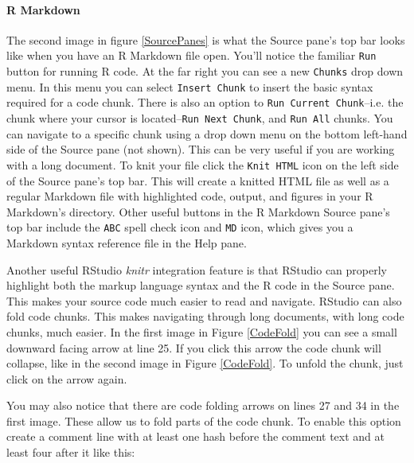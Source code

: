 \paragraph{R Markdown} The second image in figure \ref{SourcePanes} is what the Source pane's top bar looks like when you have an R Markdown file open. You'll notice the familiar \texttt{Run} button for running R code. At the far right you can see a new \texttt{Chunks} drop down menu. In this menu you can select \texttt{Insert Chunk} to insert the basic syntax required for a code chunk. There is also an option to \texttt{Run Current Chunk}--i.e. the chunk where your cursor is located--\texttt{Run Next Chunk}, and \texttt{Run All} chunks. You can navigate to a specific chunk using a drop down menu on the bottom left-hand side of the Source pane (not shown). This can be very useful if you are working with a long document. To knit your file click the \texttt{Knit HTML} icon on the left side of the Source pane's top bar. This will create a knitted HTML file as well as a regular Markdown file with highlighted code, output, and figures in your R Markdown's directory. Other useful buttons in the R Markdown Source pane's top bar include the \texttt{ABC} spell check icon and \texttt{MD} icon, which gives you a Markdown syntax reference file in the Help pane.

Another useful RStudio {\emph{knitr}} integration feature is that RStudio can properly highlight both the markup language syntax and the R code in the Source pane. This makes your source code much easier to read and navigate. RStudio can also fold code chunks. This makes navigating through long documents, with long code chunks, much easier. In the first image in Figure \ref{CodeFold} you can see a small downward facing arrow at line 25. If you click this arrow the code chunk will collapse, like in the second image in Figure \ref{CodeFold}. To unfold the chunk, just click on the arrow again.

You may also notice that there are code folding arrows on lines 27 and 34 in the first image. These allow us to fold parts of the code chunk. To enable this option create a comment line with at least one hash before the comment text and at least four after it like this:

\begin{knitrout}
\color{fgcolor}\begin{kframe}
\begin{alltt}
\end{alltt}
\end{kframe}
\end{knitrout}


